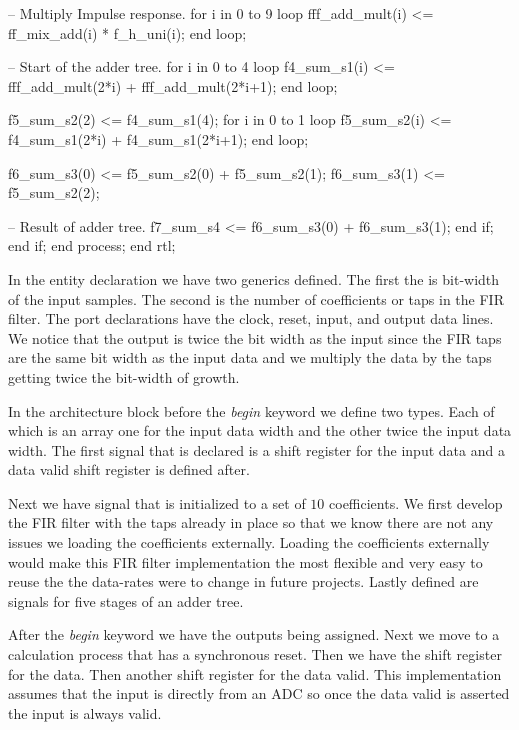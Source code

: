 \begin{VHDLlisting}[tabsize=2]
				-- Multiply Impulse response. 
				for i in 0 to 9 loop
					fff_add_mult(i) <= ff_mix_add(i) * f_h_uni(i);
				end loop;				
				
				-- Start of the adder tree.
				for i in 0 to 4 loop
					f4_sum_s1(i) <= fff_add_mult(2*i) + fff_add_mult(2*i+1);
				end loop;
				
				f5_sum_s2(2) <= f4_sum_s1(4);
				for i in 0 to 1 loop
					f5_sum_s2(i) <= f4_sum_s1(2*i) + f4_sum_s1(2*i+1);
				end loop;
				
				f6_sum_s3(0) <= f5_sum_s2(0) + f5_sum_s2(1);
				f6_sum_s3(1) <= f5_sum_s2(2);
								
				-- Result of adder tree.
				f7_sum_s4 <= f6_sum_s3(0) + f6_sum_s3(1);
			end if;			
		end if;
	end process;
end rtl;
\end{VHDLlisting}
	
In the entity declaration we have two generics defined. The first the is bit-width of the input samples. The second is the number of coefficients or taps in the \ac{FIR} filter. The port declarations have the clock, reset, input, and output data lines. We notice that the output is twice the bit width as the input since the \ac{FIR} taps are the same bit width as the input data and we multiply the data by the taps getting twice the bit-width of growth. 

In the architecture block before the \emph{begin} keyword we define two types. Each of which is an array one for the input data width and the other twice the input data width. The first signal that is declared is a shift register for the input data and a data valid shift register is defined after. 

Next we have signal that is initialized to a set of $10$ coefficients. We first develop the \ac{FIR} filter with the taps already in place so that we know there are not any issues we loading the coefficients externally. Loading the coefficients externally would make this \ac{FIR} filter implementation the most flexible and very easy to reuse the the data-rates were to change in future projects. Lastly defined are signals for five stages of an adder tree.

After the \emph{begin} keyword we have the outputs being assigned. Next we move to a calculation process that has a synchronous reset. Then we have the shift register for the data. Then another shift register for the data valid. This implementation assumes that the input is directly from an \ac{ADC} so once the data valid is asserted the input is always valid. 

